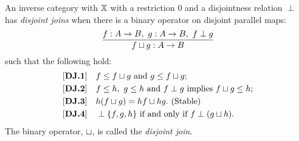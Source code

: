 \begin{definition}\label{def:disjoint_join}
  An inverse category with $\mathbb{X}$ with a restriction $0$ and a disjointness relation $\perp$ has
  \emph{disjoint joins} when there is a binary operator on disjoint parallel maps:
  \[
    \infer{f \djoin g : A \to B}{f: A\to B,\ g: A\to B,\ f \perp g}
  \]
  such that the following hold:
  \begin{align*}
    \axiom{DJ}{1}\quad & f \le f \djoin g\text{ and }g \le f \djoin g; \\
    \axiom{DJ}{2}\quad & f \le h,\ g \le h\text{ and }f\perp g\text{ implies }f \djoin g \le h;\\
    \axiom{DJ}{3}\quad & h(f \djoin g) = h f \djoin h g. \text{ (Stable)} \\
    \axiom{DJ}{4}\quad & \cdperp \{f, g, h\}\text{ if and only if }f \perp (g\djoin h).\\
  \end{align*}
  The binary operator, $\sqcup$, is called the \emph{disjoint join}.
\end{definition}

